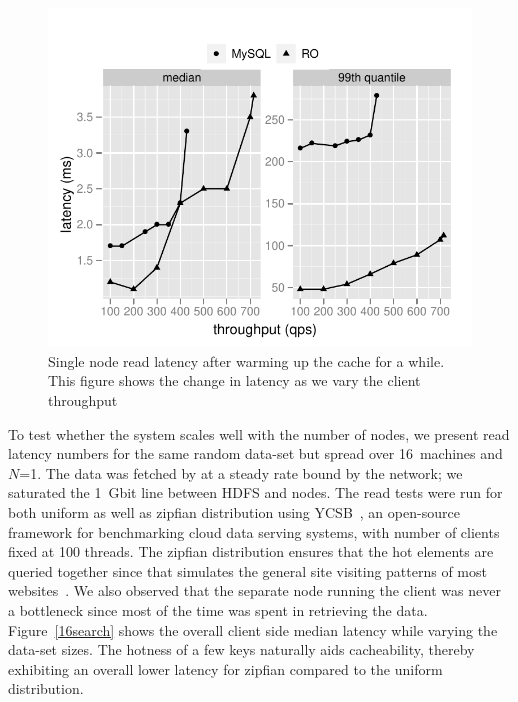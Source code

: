 \begin{figure}
  \centering
    \includegraphics[scale=0.55]{images/mysql_vs_read.pdf}
  \caption{Single node read latency after warming up the cache for a while. This figure shows the change in latency as we vary the client throughput}
  \label{mysql:search}
\end{figure}

To test whether the system scales well with the number of nodes, we
present read latency numbers for the same random data-set but spread
over 16~machines and $N$=1. The data was fetched by \projectname{} at a steady
rate bound by the network; we saturated the 1~Gbit line between HDFS
and \projectname{} nodes. The read tests were run for both uniform as well as
zipfian distribution using YCSB~\cite{ycsb}, an open-source framework 
for benchmarking cloud data serving systems, with number of clients fixed
at 100 threads. The zipfian distribution ensures that the hot elements are 
queried together since that simulates the general site visiting patterns 
of most websites~\cite{zipf}. We also observed that the separate node
running the client was never a bottleneck since most of the time was
spent in retrieving the data.
Figure~\ref{16search} shows the overall client side median latency while varying 
the data-set sizes. The hotness of a few keys naturally aids cacheability, 
thereby exhibiting an overall lower latency for zipfian compared to 
the uniform distribution. 

